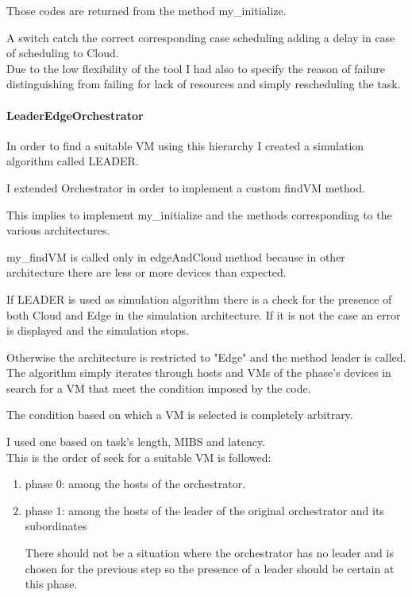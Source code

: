 \documentclass[12pt]{report}
\begin{document}
Those codes are returned from the method my\_initialize.

A switch catch the correct corresponding case scheduling  adding a delay in case of scheduling to Cloud.\\
Due to the low flexibility of the tool I had also to specify the reason of failure distinguishing from failing for lack of resources and simply rescheduling the task.


\paragraph{LeaderEdgeOrchestrator}

In order to find a suitable VM using this hierarchy I created a simulation algorithm called LEADER.

I extended Orchestrator in order to implement a custom findVM method.

This implies to implement my\_initialize and the methods corresponding to the various architectures.

my\_findVM is called only in edgeAndCloud method because in other architecture there are less or more devices than expected.

If LEADER is used as simulation algorithm there is a check for the presence of both Cloud and Edge in the simulation architecture. If it is not the case an error is displayed and the simulation stops.

Otherwise the architecture is restricted to "Edge" and the method leader is called.\\

The algorithm simply iterates through hosts and VMs of the phase's devices in search for a VM that meet the condition imposed by the code.

The condition based on which a VM is selected is completely arbitrary.

I used one based on task's length, MIBS and latency.\\

This is the order of seek for a suitable VM is followed:
\begin{enumerate}
	\item phase 0: among the hosts of the orchestrator.
	\item phase 1: among the hosts of the leader of the original orchestrator and its subordinates
	
	There should not be a situation where the orchestrator has no leader and is chosen for the previous step so the presence of a leader should be certain at this phase.
\end{enumerate}
\end{document}

